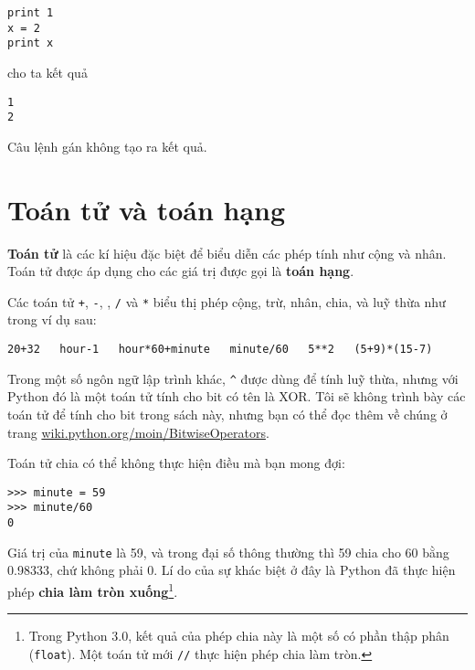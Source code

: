 \documentclass[11pt]{book}
\begin{document}
\beforeverb
\begin{verbatim}
print 1
x = 2
print x
\end{verbatim}
\afterverb
%
cho ta kết quả

\beforeverb
\begin{verbatim}
1
2
\end{verbatim}
\afterverb
%
Câu lệnh gán không tạo ra kết quả.


\section{Toán tử và toán hạng}

{\bf Toán tử} là các kí hiệu đặc biệt để biểu diễn các
phép tính như cộng và nhân. Toán tử được áp dụng cho các
giá trị được gọi là {\bf toán hạng}.

Các toán tử {\tt +}, {\tt -}, {\tt *}, {\tt /} và {\tt **}
biểu thị phép cộng, trừ, nhân, chia, và luỹ thừa như trong
ví dụ sau:

\beforeverb
\begin{verbatim}
20+32   hour-1   hour*60+minute   minute/60   5**2   (5+9)*(15-7)
\end{verbatim}
\afterverb
%
Trong một số ngôn ngữ lập trình khác, \verb"^" được dùng để tính
luỹ thừa, nhưng với Python đó là một toán tử tính cho bit có tên là
XOR. Tôi sẽ không trình bày các toán tử để tính cho bit trong sách này,
nhưng bạn có thể đọc thêm về chúng ở trang \url{wiki.python.org/moin/BitwiseOperators}.



Toán tử chia có thể không thực hiện điều mà bạn mong đợi:

\beforeverb
\begin{verbatim}
>>> minute = 59
>>> minute/60
0
\end{verbatim}
\afterverb
%
Giá trị của {\tt minute} là 59, và trong đại số thông thường thì 59
chia cho 60 bằng 0.98333, chứ không phải 0. Lí do của sự khác biệt 
ở đây là Python đã thực hiện phép {\bf chia làm tròn xuống}\footnote{Trong Python 3.0, kết quả của phép chia này là một số có phần thập phân 
({\tt float}). Một toán tử mới {\tt //} thực hiện phép chia làm tròn.}.

\end{document}

